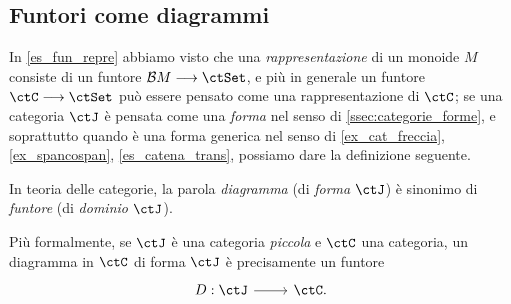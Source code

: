 \subsection{Funtori come diagrammi}
In \ref{es_fun_repre} abbiamo visto che una \emph{rappresentazione} di un monoide \(M\) consiste di un funtore \(\susp M \fun\ctSet\), e più in generale un funtore \(\ctC\fun\ctSet\) può essere pensato come una rappresentazione di \(\ctC\); se una categoria \(\ctJ\) è pensata come una \emph{forma} nel senso di \ref{ssec:categorie_forme}, e soprattutto quando è una forma generica nel senso di \ref{ex_cat_freccia}, \ref{ex_spancospan}, \ref{es_catena_trans}, possiamo dare la definizione seguente.
\begin{definition}\label{def_diagramma_comm}
	In teoria delle categorie, la parola \emph{diagramma} (di \emph{forma} \(\ctJ\)) è sinonimo di \emph{funtore} (di \emph{dominio} \(\ctJ\)).

	Più formalmente, se \(\ctJ\) è una categoria \emph{piccola} e \(\ctC\) una categoria, un diagramma in \(\ctC\) di forma \(\ctJ\) è precisamente un funtore
	\[\begin{tikzcd}
			D : \ctJ \ar[r] & \ctC.
		\end{tikzcd}
	\]
\end{definition}
